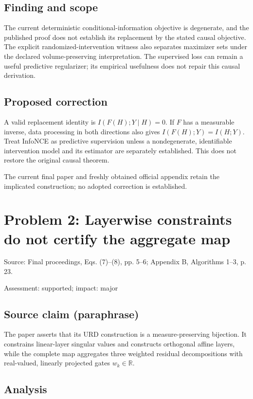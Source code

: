 \documentclass[11pt]{article}
\begin{document}
\subsection*{Finding and scope}

The current deterministic conditional-information objective is degenerate, and the published proof does not establish its replacement by the stated causal objective. The explicit randomized-intervention witness also separates maximizer sets under the declared volume-preserving interpretation. The supervised loss can remain a useful predictive regularizer; its empirical usefulness does not repair this causal derivation.

\subsection*{Proposed correction}

A valid replacement identity is \(I(F(H);Y\mid H)=0\). If \(F\) has a measurable inverse, data processing in both directions also gives \(I(F(H);Y)=I(H;Y)\). Treat InfoNCE as predictive supervision unless a nondegenerate, identifiable intervention model and its estimator are separately established. This does not restore the original causal theorem.

The current final paper and freshly obtained official appendix retain the implicated construction; no adopted correction is established.

\section*{Problem 2: Layerwise constraints do not certify the aggregate map}

Source: Final proceedings, Eqs. (7)–(8), pp. 5–6; Appendix B, Algorithms 1–3, p. 23.

Assessment: supported; impact: major

\subsection*{Source claim (paraphrase)}

The paper asserts that its URD construction is a measure-preserving bijection. It constrains linear-layer singular values and constructs orthogonal affine layers, while the complete map aggregates three weighted residual decompositions with real-valued, linearly projected gates \(w_k\in\mathbb R\).

\subsection*{Analysis}
\end{document}
